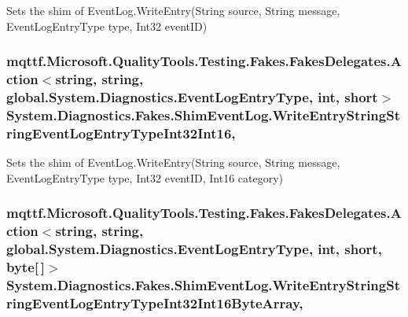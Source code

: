 Sets the shim of Event\-Log.\-Write\-Entry(\-String source, String message, Event\-Log\-Entry\-Type type, Int32 event\-I\-D)

\hypertarget{class_system_1_1_diagnostics_1_1_fakes_1_1_shim_event_log_a655541342ba3d1b945e93221925b18a5}{
\subsubsection[{Write\-Entry\-String\-String\-Event\-Log\-Entry\-Type\-Int32\-Int16}]{\setlength{\rightskip}{0pt plus 5cm}mqttf.\-Microsoft.\-Quality\-Tools.\-Testing.\-Fakes.\-Fakes\-Delegates.\-Action$<$string, string, global.\-System.\-Diagnostics.\-Event\-Log\-Entry\-Type, int, short$>$ System.\-Diagnostics.\-Fakes.\-Shim\-Event\-Log.\-Write\-Entry\-String\-String\-Event\-Log\-Entry\-Type\-Int32\-Int16\hspace{0.3cm}{\ttfamily [static]}, {\ttfamily [set]}}}\label{class_system_1_1_diagnostics_1_1_fakes_1_1_shim_event_log_a655541342ba3d1b945e93221925b18a5}


Sets the shim of Event\-Log.\-Write\-Entry(\-String source, String message, Event\-Log\-Entry\-Type type, Int32 event\-I\-D, Int16 category)

\hypertarget{class_system_1_1_diagnostics_1_1_fakes_1_1_shim_event_log_ab8ecba0affefe2d47b4513812d79e156}{
\subsubsection[{Write\-Entry\-String\-String\-Event\-Log\-Entry\-Type\-Int32\-Int16\-Byte\-Array}]{\setlength{\rightskip}{0pt plus 5cm}mqttf.\-Microsoft.\-Quality\-Tools.\-Testing.\-Fakes.\-Fakes\-Delegates.\-Action$<$string, string, global.\-System.\-Diagnostics.\-Event\-Log\-Entry\-Type, int, short, byte\mbox{[}$\,$\mbox{]}$>$ System.\-Diagnostics.\-Fakes.\-Shim\-Event\-Log.\-Write\-Entry\-String\-String\-Event\-Log\-Entry\-Type\-Int32\-Int16\-Byte\-Array\hspace{0.3cm}{\ttfamily [static]}, {\ttfamily [set]}}}\label{class_system_1_1_diagnostics_1_1_fakes_1_1_shim_event_log_ab8ecba0affefe2d47b4513812d79e156}



